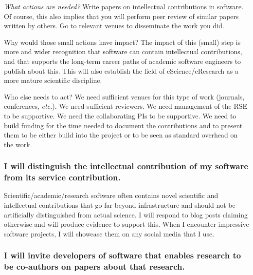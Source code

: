 \documentclass[a4paper,UKenglish]{dagman}
\renewcommand{\paragraph}[1]{\subsubsection*{#1}\xspace}
\newcommand{\etc}{\emph{etc.}\xspace}
\begin{document}
\emph{What actions are needed?}
Write papers on intellectual contributions in software. Of course, this also implies that you will perform peer review of similar papers written by others. Go to relevant venues to disseminate the work you did.

Why would those small actions have impact?
The impact of this (small) step is more and wider recognition that software can contain intellectual contributions, and that supports the long-term career paths of academic software engineers to publish about this. This will also establish the field of eScience/eResearch as a more mature scientific discipline.

Who else needs to act?
We need sufficient venues for this type of work (journals, conferences, \etc).  We need sufficient reviewers.  We need management of the RSE to be supportive.  We need the collaborating PIs to be supportive.  We need to build funding for the time needed to document the contributions and to present them to be either build into the project or to be seen as standard overhead on the work.



\paragraph{I will distinguish the intellectual contribution of my software from its service contribution.}



Scientific/academic/research software often contains novel scientific and intellectual contributions that go far beyond infrastructure and should not be artificially distinguished from actual science. I will respond to blog posts claiming otherwise and will produce evidence to support this. When I encounter impressive software projects, I will showcase them on any social media that I use.

\paragraph{I will invite developers of software that enables research to be co-authors on papers about that research.}


\end{document}
